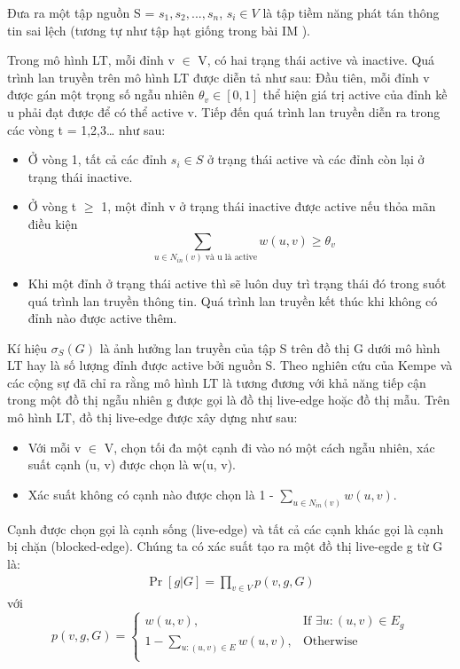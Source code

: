 Đưa ra một tập nguồn S = {$s_{1}, s_{2}, ... , s_{n}$}, $s_{i} \in V$ là tập tiềm năng phát tán thông tin sai lệch (tương tự như tập hạt giống trong bài IM \cite{kempe21}).

Trong mô hình LT, mỗi đỉnh v $\in$ V, có hai trạng thái active và inactive. Quá trình lan truyền trên mô hình LT được diễn tả như sau: Đầu tiên, mỗi đỉnh v được gán một trọng số ngẫu nhiên $\theta_{v} \in [0,1]$ thể hiện giá trị active của đỉnh kề u phải đạt được để có thể active v. Tiếp đến quá trình lan truyền diễn ra trong các vòng t = 1,2,3… như sau: 		
\begin {itemize}
\item Ở vòng 1, tất cả các đỉnh $s_{i} \in S$ ở trạng thái active và các đỉnh còn lại ở trạng thái inactive.

\item Ở vòng t $\ge$ 1, một đỉnh v ở trạng thái inactive được active nếu thỏa mãn điều kiện $$\sum_{\mbox{ $u \in N_{in}(v) $ và  u  là active}} w(u, v)\geq \theta_v$$

\item Khi một đỉnh ở trạng thái active thì sẽ luôn duy trì trạng thái đó trong suốt quá trình lan truyền thông tin. Quá trình lan truyền kết thúc khi không có đỉnh nào được active thêm.	
\end {itemize}

Kí hiệu $\sigma_{S}(G)$ là ảnh hưởng lan truyền của tập S trên đồ thị G dưới mô hình LT hay là số lượng đỉnh được active bởi nguồn S. Theo nghiên cứu của Kempe và các cộng sự đã chỉ ra rằng mô hình LT là tương đương với khả năng tiếp cận trong một đồ thị ngẫu nhiên g được gọi là đồ thị live-edge hoặc đồ thị mẫu. Trên mô hình LT, đồ thị live-edge được xây dựng như sau:
\begin {itemize}
\item Với mỗi v $\in$ V, chọn tối đa một cạnh đi vào nó một cách ngẫu nhiên, xác suất cạnh (u, v) được chọn là w(u, v).

\item Xác suất không có cạnh nào được chọn là 1 - $\sum_{u \in N_{in}(v)} w(u,v)$.
\end {itemize}

Cạnh được chọn gọi là cạnh sống (live-edge) và tất cả các cạnh khác gọi là cạnh bị chặn (blocked-edge). Chúng ta có xác suất tạo ra một đồ thị live-egde g từ G là:
\begin{align}
\Pr[g|G]=\prod_{v \in V}{p(v,g,G)}
\end{align}
với
\begin{equation}
p(v, g, G)= \left\{ \begin{array}{ll}
w(u, v), & \mbox{If $\exists u: (u, v) \in E_g$}\\
1-\sum_{u:(u, v) \in E}{w(u, v)}, & \mbox{Otherwise}\\
\end{array} \right.
\end{equation}

